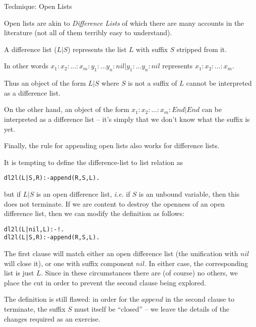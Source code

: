 \documentclass{popl}
\begin{document}
\begin{foil}
\begin{cframed}
Technique: Open Lists
\end{cframed}
\begin{note}
Open lists are akin to {\it Difference Lists} of which there are many
accounts in the literature (not all of them terribly easy to understand). 

A difference list ($L|S$) represents the list $L$ with suffix $S$ 
stripped from it.

In other words $x_1:x_2:...:x_m:y_1:...y_n:nil | y_1:...y_n:nil$ represents
$x_1:x_2:...:x_m$. 

Thus an object of the form $L|S$ where $S$ is not a suffix of $L$
cannot be interpreted as a difference list.

On the other hand, an object of the form
$x_1:x_2:...:x_m:End|End$ can be interpreted as a difference list -- it's simply that we don't know
what the suffix is yet.

Finally, the rule for appending open lists also works for difference lists.

It is tempting to define the difference-list to list relation as
\begin{alltt}
        dl2l(L|S, R) :- append(R, S, L).
\end{alltt}

but if $L|S$ is an open difference list, {\it i.e.} if $S$ is an unbound variable,
then this does not terminate. If we are content to destroy the openness
of an open difference list, then we can modify the definition as follows:
\begin{alltt}
        dl2l(L|nil, L) :- !.
        dl2l(L|S, R)   :- append(R, S, L).
\end{alltt}

The first clause will match either an open difference list (the unification with
$nil$ will close it), or one with suffix component $nil$. 
In either case, the corresponding list is just $L$. Since in
these circumstances there are (of course) no others, we place the cut
in order to prevent the second clause being explored.

The definition is still flawed: in order for the $append$ in
the second clause to terminate, the suffix $S$ must itself be
``closed'' -- we leave the details of the changes 
required as an exercise.

\begin{comment}
        #infix1 |
        closed(nil)  :- !.
        closed(X:XS) :- closed(XS).
        dl2l(L|S, R) :- closed(S), append(R, S, L).
\end{comment}


\end{note}
\end{foil}
\end{document}
